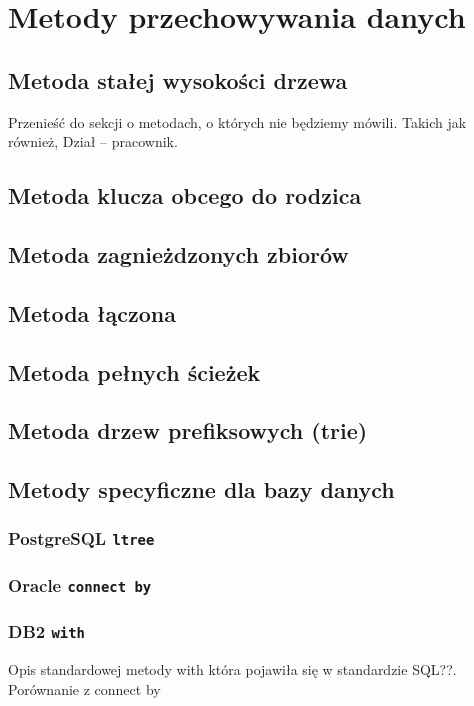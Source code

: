 \documentclass[10pt,a4paper,oneside]{book}
\begin{document}
\chapter{Metody przechowywania danych}

\section{Metoda stałej wysokości drzewa}

Przenieść do sekcji o metodach, o których nie będziemy mówili. Takich jak również, Dział -- pracownik.

\section{Metoda klucza obcego do rodzica}

\section{Metoda zagnieżdzonych zbiorów}

\section{Metoda łączona}

\section{Metoda pełnych ścieżek}

\section{Metoda drzew prefiksowych (trie)}

\section{Metody specyficzne dla bazy danych}
\subsection{PostgreSQL \texttt{ltree}}
\subsection{Oracle \texttt{connect by}}
\subsection{DB2 \texttt{with}}
Opis standardowej metody with która pojawiła się w standardzie SQL??. Porównanie z connect by
\end{document}
